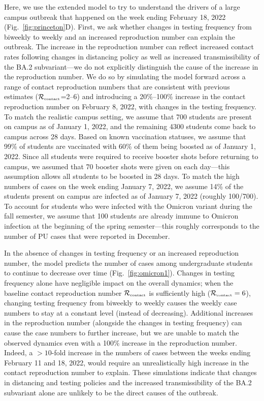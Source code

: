 \documentclass[12pt]{article}
\newcommand{\fref}[1]{Fig.~\ref{fig:#1}}
\newcommand{\Rx}[1]{\ensuremath{{\mathcal R}_{#1}}}
\newcommand{\Rc}{\Rx{\textrm{\tiny{contact}}}}
\begin{document}
Here, we use the extended model to try to understand the drivers of a large campus outbreak that happened on the week ending February 18, 2022 (\fref{princeton}D).
First, we ask whether changes in testing frequency from biweekly to weekly and an increased reproduction number can explain the outbreak. 
The increase in the reproduction number can reflect increased contact rates following changes in distancing policy as well as increased transmissibility of the BA.2 subvariant---we do not explicitly distinguish the cause of the increase in the reproduction number. 
We do so by simulating the model forward across a range of contact reproduction numbers that are consistent with previous estimates ($\Rc$=2--6) and introducing a 20\%--100\% increase in the contact reproduction number on February 8, 2022, with changes in the testing frequency.
To match the realistic campus setting, we assume that 700 students are present on campus as of January 1, 2022, and the remaining 4300 students come back to campus across 28 days.
Based on known vaccination statuses, we assume that 99\% of students are vaccinated with 60\% of them being boosted as of January 1, 2022.
Since all students were required to receive booster shots before returning to campus, we assumed that 70 booster shots were given on each day---this assumption allows all students to be boosted in 28 days.
To match the high numbers of cases on the week ending January 7, 2022, we assume 14\% of the students present on campus are infected as of January 7, 2022 (roughly 100/700).
To account for students who were infected with the Omicron variant during the fall semester, we assume that 100 students are already immune to Omicron infection at the beginning of the spring semester---this roughly corresponds to the number of PU cases that were reported in December.

In the absence of changes in testing frequency or an increased reproduction number, the model predicts the number of cases among undergraduate students to continue to decrease over time (\fref{omicron1}).
Changes in testing frequency alone have negligible impact on the overall dynamics; when the baseline contact reproduction number $\Rc$ is sufficiently high ($\Rc = 6$), changing testing frequency from biweekly to weekly causes the weekly case numbers to stay at a constant level (instead of decreasing).
Additional increases in the reproduction number (alongside the changes in testing frequency) can cause the case numbers to further increase, but we are unable to match the observed dynamics even with a 100\% increase in the reproduction number.
Indeed, a $>10$-fold increase in the numbers of cases between the weeks ending February 11 and 18, 2022, would require an unrealistically high increase in the contact reproduction number to explain.
These simulations indicate that changes in distancing and testing policies and the increased transmissibility of the BA.2 subvariant alone are unlikely to be the direct causes of the outbreak.
\end{document}
